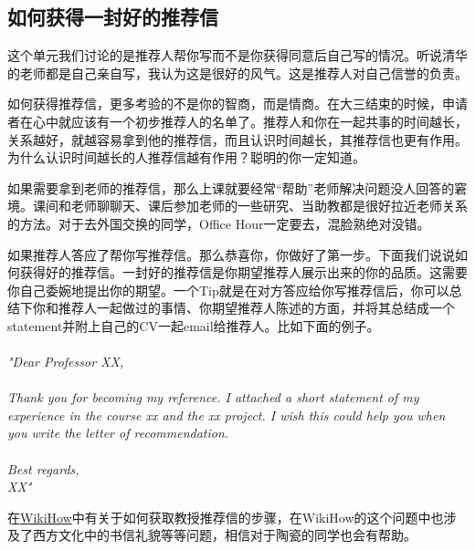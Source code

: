 \subsection{如何获得一封好的推荐信}
这个单元我们讨论的是推荐人帮你写而不是你获得同意后自己写的情况。听说清华的老师都是自己亲自写，我认为这是很好的风气。这是推荐人对自己信誉的负责。\par
如何获得推荐信，更多考验的不是你的智商，而是情商。在大三结束的时候，申请者在心中就应该有一个初步推荐人的名单了。推荐人和你在一起共事的时间越长，关系越好，就越容易拿到他的推荐信，而且认识时间越长，其推荐信也更有作用。为什么认识时间越长的人推荐信越有作用？聪明的你一定知道。\par
如果需要拿到老师的推荐信，那么上课就要经常“帮助”老师解决问题没人回答的窘境。课间和老师聊聊天、课后参加老师的一些研究、当助教都是很好拉近老师关系的方法。对于去外国交换的同学，Office Hour一定要去，混脸熟绝对没错。\par

如果推荐人答应了帮你写推荐信。那么恭喜你，你做好了第一步。下面我们说说如何获得好的推荐信。一封好的推荐信是你期望推荐人展示出来的你的品质。这需要你自己委婉地提出你的期望。一个Tip就是在对方答应给你写推荐信后，你可以总结下你和推荐人一起做过的事情、你期望推荐人陈述的方面，并将其总结成一个statement并附上自己的CV一起email给推荐人。比如下面的例子。\\
\\
\emph{
"Dear Professor XX,\\
\\
Thank you for becoming my reference. I attached a short statement of my experience in the course xx and the xx project. I wish this could help you when you write the letter of recommendation.\\
\\
Best regards,\\
XX"
}\par
在\href{http://www.wikihow.com/Ask-Your-Professor-for-a-Letter-of-Recommendation-Via-Email}{WikiHow}中有关于如何获取教授推荐信的步骤，在WikiHow的这个问题中也涉及了西方文化中的书信礼貌等等问题，相信对于陶瓷的同学也会有帮助。


